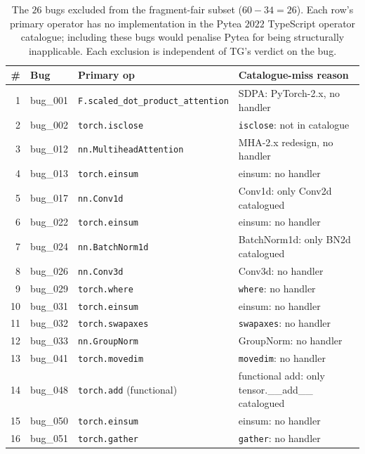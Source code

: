 \begin{table}[h]
\centering\scriptsize
\setlength{\tabcolsep}{3pt}
\caption{The $26$ bugs excluded from the fragment-fair subset
($60-34=26$). Each row's primary operator has no implementation
in the Pytea $2022$ TypeScript operator catalogue; including
these bugs would penalise Pytea for being structurally inapplicable.
Each exclusion is independent of TG's verdict on the bug.}
\label{tab:pytea-excluded}
\begin{tabular}{r l l l}
\toprule
\# & Bug & Primary op & Catalogue-miss reason \\
\midrule
1  & bug\_001 & \texttt{F.scaled\_dot\_product\_attention} & SDPA: PyTorch-2.x, no handler \\
2  & bug\_002 & \texttt{torch.isclose}                     & \texttt{isclose}: not in catalogue \\
3  & bug\_012 & \texttt{nn.MultiheadAttention}             & MHA-2.x redesign, no handler \\
4  & bug\_013 & \texttt{torch.einsum}                      & einsum: no handler \\
5  & bug\_017 & \texttt{nn.Conv1d}                         & Conv1d: only Conv2d catalogued \\
6  & bug\_022 & \texttt{torch.einsum}                      & einsum: no handler \\
7  & bug\_024 & \texttt{nn.BatchNorm1d}                    & BatchNorm1d: only BN2d catalogued \\
8  & bug\_026 & \texttt{nn.Conv3d}                         & Conv3d: no handler \\
9  & bug\_029 & \texttt{torch.where}                       & \texttt{where}: no handler \\
10 & bug\_031 & \texttt{torch.einsum}                      & einsum: no handler \\
11 & bug\_032 & \texttt{torch.swapaxes}                    & \texttt{swapaxes}: no handler \\
12 & bug\_033 & \texttt{nn.GroupNorm}                      & GroupNorm: no handler \\
13 & bug\_041 & \texttt{torch.movedim}                     & \texttt{movedim}: no handler \\
14 & bug\_048 & \texttt{torch.add} (functional)            & functional add: only tensor.\_\_add\_\_ catalogued \\
15 & bug\_050 & \texttt{torch.einsum}                      & einsum: no handler \\
16 & bug\_051 & \texttt{torch.gather}                      & \texttt{gather}: no handler \\

\end{tabular}
\end{table}

